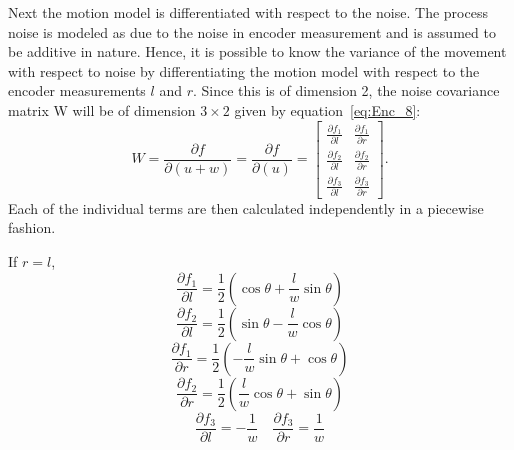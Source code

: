 Next the motion model is differentiated with respect to the noise. The process noise is modeled as due to the noise in encoder measurement and is assumed to be additive in nature. Hence, it is possible to know the variance of the movement with respect to noise by differentiating the motion model with respect to the encoder measurements $ l $ and $ r $. Since this is of dimension 2, the noise covariance matrix W will be of dimension $ 3\times 2 $ given by equation~\ref{eq:Enc_8}:
\begin{equation}
\label{eq:Enc_8}
W = \frac{\partial f}{\partial (u+w)} = \frac{\partial f}{\partial (u)} =
\begin{bmatrix}
\frac{\partial f_1}{\partial l} & \frac{\partial f_1}{\partial r}\\
\frac{\partial f_2}{\partial l} & \frac{\partial f_2}{\partial r}\\
\frac{\partial f_3}{\partial l} & \frac{\partial f_3}{\partial r}
\end{bmatrix}.
\end{equation}
Each of the individual terms are then calculated independently in a piecewise fashion.

If $ r=l $,
    \begin{equation}
		\frac{\partial f_1}{\partial l} = \frac{1}{2}(\cos\theta+\frac{l}{w}\sin\theta)
    \end{equation}
	\begin{equation}	
		\frac{\partial f_2}{\partial l} = \frac{1}{2}(\sin\theta-\frac{l}{w}\cos\theta)
    \end{equation}
	\begin{equation}
    	\frac{\partial f_1}{\partial r} = \frac{1}{2}(-\frac{l}{w}\sin\theta+\cos\theta)
    \end{equation}
	\begin{equation}	
		\frac{\partial f_2}{\partial r} = \frac{1}{2}(\frac{l}{w}\cos\theta+\sin\theta)
    \end{equation}
	\begin{equation}	
		\frac{\partial f_3}{\partial l} = -\frac{1}{w} \quad \frac{\partial f_3}{\partial r} = \frac{1}{w}
    \end{equation}
    
